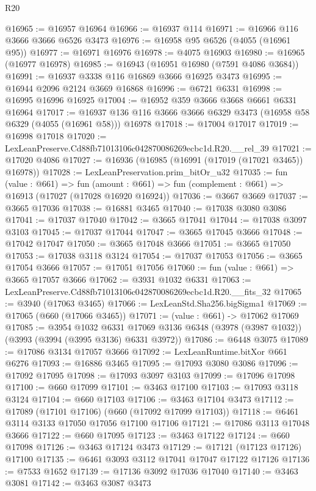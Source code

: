\begin{lexlean}{R20}
\begin{coremodule}
@16965 := @16957 @16964
@16966 := @16937 @114
@16971 := @16966 @116 @3666 @3666 @6526 @3473
@16976 := @16958 @95 @6526 (@4055 (@16961 @95))
@16977 := @16971 @16976
@16978 := @4075 @16903
@16980 := @16965 (@16977 @16978)
@16985 := @16943 (@16951 @16980 (@7591 @4086 @3684))
@16991 := @16937 @3338 @116 @16869 @3666 @16925 @3473
@16995 := @16944 @2096 @2124 @3669 @16868
@16996 := @6721 @6331
@16998 := @16995 @16996 @16925
@17004 := @16952 @359 @3666 @3668 @6661 @6331 @16964
@17017 := @16937 @136 @116 @3666 @3666 @6329 @3473 (@16958 @58 @6329 (@4055 (@16961 @58))) @16978
@17018 := @17004 @17017
@17019 := @16998 @17018
@17020 := LexLeanPreserve.Cd88fb71013106c042870086269ecbc1d.R20.__rel_39
@17021 := @17020 @4086
@17027 := @16936 (@16985 (@16991 (@17019 (@17021 @3465)) @16978))
@17028 := LexLeanPreservation.prim_bitOr_u32
@17035 := fun (value : @661) =>
  fun (amount : @661) => fun (complement : @661) => @16913 (@17027 (@17028 @16920 @16924))
@17036 := @3667 @3669
@17037 := @3665 @17036
@17038 := @16881 @3465
@17040 := @17038 @3080 @3086
@17041 := @17037 @17040
@17042 := @3665 @17041
@17044 := @17038 @3097 @3103
@17045 := @17037 @17044
@17047 := @3665 @17045 @3666
@17048 := @17042 @17047
@17050 := @3665 @17048 @3666
@17051 := @3665 @17050
@17053 := @17038 @3118 @3124
@17054 := @17037 @17053
@17056 := @3665 @17054 @3666
@17057 := @17051 @17056
@17060 := fun (value : @661) => @3665 @17057 @3666
@17062 := @3931 @1032 @6331
@17063 := LexLeanPreserve.Cd88fb71013106c042870086269ecbc1d.R20.__fits_32
@17065 := @3940 (@17063 @3465)
@17066 := LexLeanStd.Sha256.bigSigma1
@17069 := @17065 (@660 (@17066 @3465))
@17071 := (value : @661) -> @17062 @17069
@17085 := @3954
    @1032
    @6331
    @17069
    @3136
    @6348
    (@3978 (@3987 @1032))
    (@3993 (@3994 (@3995 @3136) @6331 @3972))
@17086 := @6448 @3075
@17089 := @17086 @3134 @17057 @3666
@17092 := LexLeanRuntime.bitXor @661 @6276
@17093 := @16886 @3465
@17095 := @17093 @3080 @3086
@17096 := @17092 @17095
@17098 := @17093 @3097 @3103
@17099 := @17096 @17098
@17100 := @660 @17099
@17101 := @3463 @17100
@17103 := @17093 @3118 @3124
@17104 := @660 @17103
@17106 := @3463 @17104 @3473
@17112 := @17089 (@17101 @17106) (@660 (@17092 @17099 @17103))
@17118 := @6461 @3114 @3133 @17050 @17056 @17100 @17106
@17121 := @17086 @3113 @17048 @3666
@17122 := @660 @17095
@17123 := @3463 @17122
@17124 := @660 @17098
@17126 := @3463 @17124 @3473
@17129 := @17121 (@17123 @17126) @17100
@17135 := @6461 @3093 @3112 @17041 @17047 @17122 @17126
@17136 := @7533 @1652
@17139 := @17136 @3092 @17036 @17040
@17140 := @3463 @3081
@17142 := @3463 @3087 @3473

\end{coremodule}
\end{lexlean}

